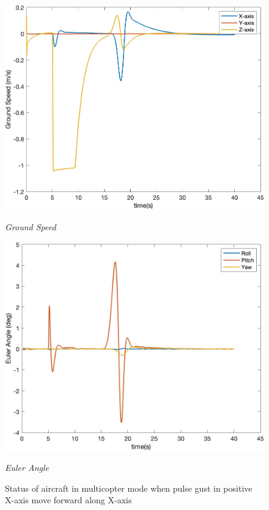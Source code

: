 \begin{figure}[htbp]
\begin{minipage}[b]{0.45\textwidth}
    \centering
    \includegraphics[width=\textwidth]{Images/Gust/VTOL pulse/3 groundspeed_2.jpg}
    \caption*{\textit{Ground Speed}}
  \end{minipage}
  \hfil
  \begin{minipage}[b]{0.45\textwidth}
    \centering
    \includegraphics[width=\textwidth]{Images/Gust/VTOL pulse/4 EulerAngle_2.jpg}
    \caption*{\textit{Euler Angle}}
  \end{minipage}
  \caption{Status of aircraft in multicopter mode when pulse gust in positive X-axis move forward along X-axis}
  \label{fig:VTOL pulse x}
\end{figure}

